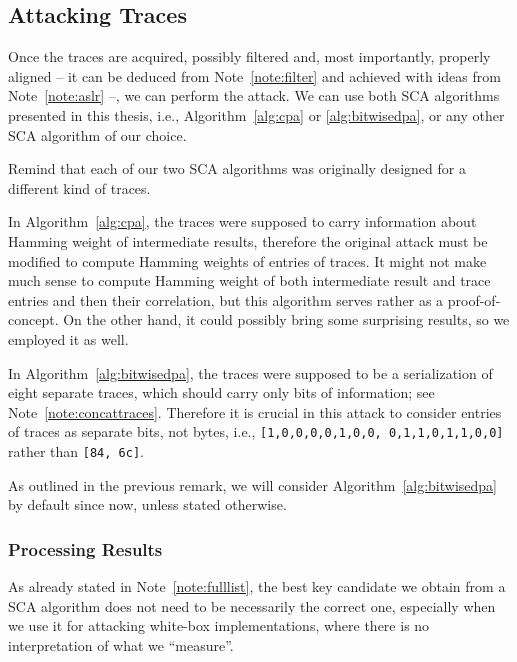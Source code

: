
\subsection{Attacking Traces}
\label{sec:attack}

Once the traces are acquired, possibly filtered and, most importantly, properly aligned -- it can be deduced from Note~\ref{note:filter} and achieved with ideas from Note~\ref{note:aslr} --, we can perform the attack. We can use both SCA algorithms presented in this thesis, i.e., Algorithm~\ref{alg:cpa} or \ref{alg:bitwisedpa}, or any other SCA algorithm of our choice.

\begin{remark}
\label{rem:traceformat}
	Remind that each of our two SCA algorithms was originally designed for a different kind of traces.
	
	In Algorithm~\ref{alg:cpa}, the traces were supposed to carry information about Hamming weight of intermediate results, therefore the original attack must be modified to compute Hamming weights of entries of traces. It might not make much sense to compute Hamming weight of both intermediate result and trace entries and then their correlation, but this algorithm serves rather as a proof-of-concept. On the other hand, it could possibly bring some surprising results, so we employed it as well.
	
	In Algorithm~\ref{alg:bitwisedpa}, the traces were supposed to be a serialization of eight separate traces, which should carry only bits of information; see Note~\ref{note:concattraces}. Therefore it is crucial in this attack to consider entries of traces as separate bits, not bytes, i.e., {\tt [1,0,0,0,0,1,0,0, 0,1,1,0,1,1,0,0]} rather than {\tt [84, 6c]}.
\end{remark}

As outlined in the previous remark, we will consider Algorithm~\ref{alg:bitwisedpa} by default since now, unless stated otherwise.

\subsubsection{Processing Results}
	
	As already stated in Note~\ref{note:fulllist}, the best key candidate we obtain from a SCA algorithm does not need to be necessarily the correct one, especially when we use it for attacking white-box implementations, where there is no interpretation of what we ``measure''.
	

